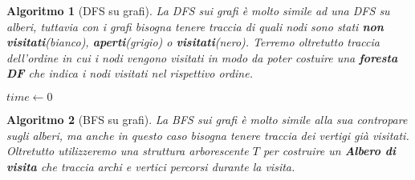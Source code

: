 \documentclass[oneside]{book}
\newtheorem{alg}{Algoritmo}
\begin{document}
\begin{alg}[DFS su grafi]
  La DFS sui grafi \`e molto simile ad una DFS su alberi, tuttavia con i grafi
  bisogna tenere traccia di quali nodi sono stati \textbf{non visitati}(bianco),
  \textbf{aperti}(grigio) o \textbf{visitati}(nero). Terremo oltretutto traccia
  dell'ordine in cui i nodi vengono visitati in modo da poter costuire una
  \textbf{foresta DF} che indica i nodi visitati nel rispettivo ordine.

  \begin{algorithm}[H]

     $time \gets 0$\;
    \;
  \end{algorithm}
\end{alg}

\begin{alg}[BFS su grafi]
  La BFS sui grafi \`e molto simile alla sua contropare sugli alberi, ma anche
  in questo caso bisogna tenere traccia dei vertigi gi\`a visitati. Oltretutto
  utilizzeremo una struttura arborescente $T$ per costruire un \textbf{Albero
  di visita} che traccia archi e vertici percorsi durante la visita.

  \begin{algorithm}[H]
  \end{algorithm}
\end{alg}
\end{document}
